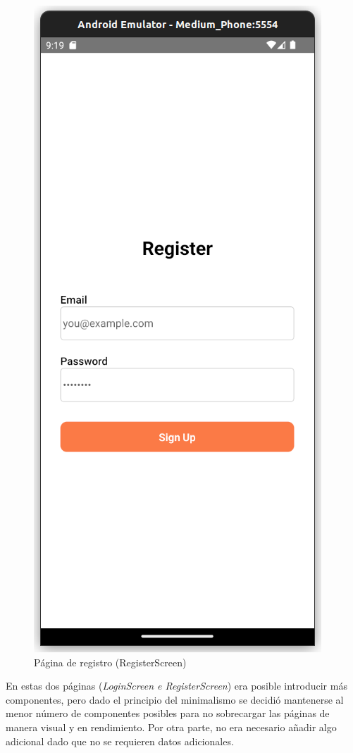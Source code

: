 \documentclass[twoside, openright, 11pt]{report}
\begin{document}
					\begin{figure}
						\centering
						\includegraphics[scale=0.5]{imagenes/RegisterScreen}
						\caption{Página de registro (RegisterScreen)}
						\label{fig:RegisterScreen}
					\end{figure}
					
					En estas dos páginas (\textit{LoginScreen e RegisterScreen}) era posible introducir más componentes, pero dado el principio del minimalismo se decidió mantenerse al menor número de componentes posibles para no sobrecargar las páginas de manera visual y en rendimiento. Por otra parte, no era necesario añadir algo adicional dado que no se requieren datos adicionales.
				
\end{document}
